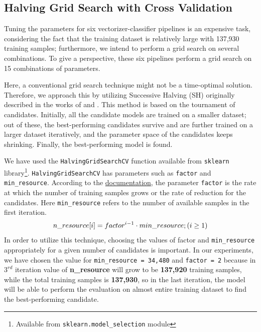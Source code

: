 \documentclass[11pt]{article}
\begin{document}
\subsection{Halving Grid Search with Cross Validation}
Tuning the parameters for six vectorizer-classifier pipelines is an expensive task, considering the fact that the training dataset is relatively large with 137,930 training samples; furthermore, we intend to perform a grid search on several combinations. To give a perspective, these six pipelines perform a grid search on 15 combinations of parameters.

Here, a conventional grid search technique might not be a time-optimal solution. Therefore, we approach this by utilizing Successive Halving (SH) originally described in the works of \cite{halving_gs1} and \cite{halving_gs2}. This method is based on the tournament of candidates. Initially, all the candidate models are trained on a smaller dataset; out of these, the best-performing candidates survive and are further trained on a larger dataset  iteratively, and the parameter space of the candidates keeps shrinking. Finally, the best-performing model is found.

We have used the \texttt{HalvingGridSearchCV} function available from \texttt{sklearn} library\footnote{Available from \texttt{sklearn.model\_selection} module}. \texttt{HalvingGridSearchCV} has parameters such as \texttt{factor} and \texttt{min\_resource}. According to the \href{https://scikit-learn.org/stable/modules/grid_search.html#id4}{documentation}, the parameter \texttt{factor} is the rate at which the number of training samples grows or the rate of reduction for the candidates. Here \texttt{min\_resource} refers to the number of available samples in the first iteration.
\begin{equation}
\small 
    n\_resource[i] = factor^{i-1} \cdot  min\_resource; (i\ge1)
\end{equation}
In order to utilize this technique, choosing the values of factor and \texttt{min\_resource} appropriately for a given number of candidates is important.
In our experiments, we have chosen the value for \texttt{min\_resource = 34,480} and \texttt{factor = 2} because in $3^{rd}$ iteration value of \textbf{n\_resource} will grow to be \textbf{137,920} training samples, while the total training samples is \textbf{137,930}, so in the last iteration, the model will be able to perform the evaluation on almost entire training dataset to find the best-performing candidate. 
\end{document}
